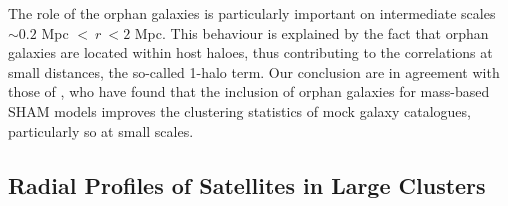 The  role  of  the  orphan   galaxies  is  particularly  important  on
intermediate scales $\sim  0.2$ Mpc $<\ r \ <  2$ Mpc.  This behaviour
is explained by the fact that  orphan galaxies are located within host
haloes, thus contributing to the  correlations at small distances, the
so-called 1-halo term.  Our conclusion are in agreement  with those of
\cite{crisis}, who  have found that  the inclusion of  orphan galaxies
for mass-based SHAM models improves  the clustering statistics of mock
galaxy catalogues, particularly so at small scales.

\subsection{Radial Profiles of Satellites in Large Clusters}\label{chap:radial-profiles}

